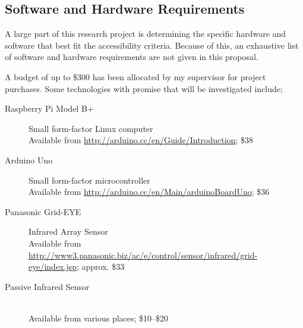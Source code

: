 \documentclass[../thesis/thesis.tex]{subfiles}
\begin{document}
\begin{bibunit}
\section{Software and Hardware Requirements}

A large part of this research project is determining the specific hardware and software that best fit the accessibility criteria. Because of this, an exhaustive list of software and hardware requirements are not given in this proposal.

A budget of up to \$300 has been allocated by my supervisor for project purchases. Some technologies with promise that will be investigated include;

\begin{description}
  \item[Raspberry Pi Model B+] Small form-factor Linux computer \hfill \\
  Available from \url{http://arduino.cc/en/Guide/Introduction}; \$38
  
  \item[Arduino Uno] Small form-factor microcontroller \hfill \\
  Available from \url{http://arduino.cc/en/Main/arduinoBoardUno}; \$36
  
  \item[Panasonic Grid-EYE] Infrared Array Sensor \hfill \\
  Available from \url{http://www3.panasonic.biz/ac/e/control/sensor/infrared/grid-eye/index.jsp}; approx. \$33
  
  \item[Passive Infrared Sensor] \hfill \\
  Available from various places; \$10--\$20
  
\end{description}

\renewcommand{\bibname}{\tocless\section{Proposal References} \vskip -1.75cm}
\putbib

\end{bibunit}
\end{document}
